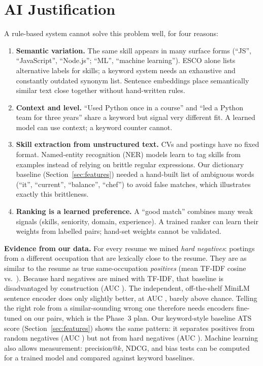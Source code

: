 \documentclass[11pt,a4paper]{article}
\begin{document}
\section{AI Justification}
A rule-based system cannot solve this problem well, for four reasons:
\begin{enumerate}
\item \textbf{Semantic variation.} The same skill appears in many surface forms (``JS'',
``JavaScript'', ``Node.js''; ``ML'', ``machine learning''). ESCO alone lists \EscoAlt
alternative labels for \EscoSkills skills; a keyword system needs an exhaustive and constantly
outdated synonym list. Sentence embeddings place semantically similar text close together
without hand-written rules.
\item \textbf{Context and level.} ``Used Python once in a course'' and ``led a Python team for
three years'' share a keyword but signal very different fit. A learned model can use context; a
keyword counter cannot.
\item \textbf{Skill extraction from unstructured text.} CVs and postings have no fixed format.
Named-entity recognition (NER) models learn to tag skills from examples instead of relying on
brittle regular expressions. Our dictionary baseline (Section~\ref{sec:features}) needed a
hand-built list of ambiguous words (``it'', ``current'', ``balance'', ``chef'') to avoid false
matches, which illustrates exactly this brittleness.
\item \textbf{Ranking is a learned preference.} A ``good match'' combines many weak signals
(skills, seniority, domain, experience). A trained ranker can learn their weights from labelled
pairs; hand-set weights cannot be validated.
\end{enumerate}
\noindent\textbf{Evidence from our data.} For every resume we mined \emph{hard negatives}:
postings from a different occupation that are lexically close to the resume. They are as
similar to the resume as true same-occupation \emph{positives} (mean TF-IDF cosine \CosHard vs.\
\CosPos). Because hard negatives are mined with TF-IDF, that baseline is disadvantaged by
construction (AUC \AucTfidf). The independent, off-the-shelf MiniLM sentence encoder does only
slightly better, at AUC \AucEmb, barely above chance. Telling the right role from a
similar-sounding wrong one therefore needs encoders fine-tuned on our pairs, which is the Phase~3
plan. Our keyword-style baseline ATS score (Section~\ref{sec:features}) shows the same pattern:
it separates positives from random negatives (AUC \AtsAucRand) but not from hard negatives
(AUC \AtsAucHard). Machine learning also allows measurement: precision@$k$, NDCG, and bias
tests can be computed for a trained model and compared against keyword baselines.
\end{document}
